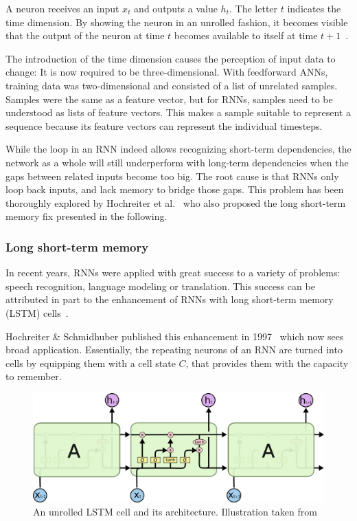 A neuron receives an input $x_t$ and outputs a value $h_t$. The letter $t$ indicates the time dimension. By showing the neuron in an unrolled fashion, it becomes visible that the output of the neuron at time $t$ becomes available to itself at time $t+1$~\cite{web:colah}.

The introduction of the time dimension causes the perception of input data to change: It is now required to be three-dimensional. With feedforward ANNs, training data was two-dimensional and consisted of a list of unrelated samples. Samples were the same as a feature vector, but for RNNs, samples need to be understood as lists of feature vectors. This makes a sample suitable to represent a sequence because its feature vectors can represent the individual timesteps.

While the loop in an RNN indeed allows recognizing short-term dependencies, the network as a whole will still underperform with long-term dependencies when the gaps between related inputs become too big. The root cause is that RNNs only loop back inputs, and lack memory to bridge those gaps. This problem has been thoroughly explored by Hochreiter et al.~\cite{hochreiter1991untersuchungen} who also proposed the long short-term memory fix presented in the following.

\subsubsection*{Long short-term memory}\label{sec:lstm}
In recent years, RNNs were applied with great success to a variety of problems: speech recognition, language modeling or translation. This success can be attributed in part to the enhancement of RNNs with long short-term memory (LSTM) cells~\cite{jozefowicz2015empirical,kuhn2013applied,schmidhuber2015deep}.

Hochreiter \& Schmidhuber published this enhancement in 1997~\cite{hochreiter1997} which now sees broad application. Essentially, the repeating neurons of an RNN are turned into cells by equipping them with a cell state $C$, that provides them with the capacity to remember.

\begin{figure}[!htb]
    \centering
    \includegraphics[width=\textwidth]{gfx/lstm-chain.png}
    \caption[An unrolled LSTM cell and its architecture]{An unrolled LSTM cell and its architecture. Illustration taken from~\cite{web:colah}}
    \label{fig:lstm}
\end{figure}

